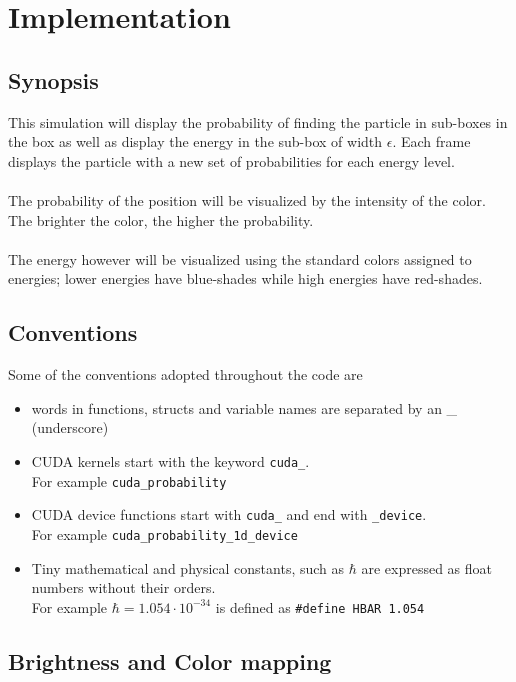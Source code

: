 \documentclass[a4paper, 10pt]{article}
\begin{document}
\newpage

\section{Implementation}
    \subsection{Synopsis}
    This simulation will display the probability of finding the particle in sub-boxes in the box
    as well as display the energy in the sub-box of width $\epsilon$. Each frame displays the
    particle with a new set of probabilities for each energy level.\\\\
    The probability of the position will be visualized by the intensity of the color. The brighter
    the color, the higher the probability.\\\\
    The energy however will be visualized using the standard colors assigned to energies; lower
    energies have blue-shades while high energies have red-shades.

    \subsection{Conventions}
    Some of the conventions adopted throughout the code are
    \begin{itemize}
        \item words in functions, structs and variable names are separated by an \_ (underscore)
        \item CUDA kernels start with the keyword \texttt{cuda\_}.\\
              For example \texttt{cuda\_probability}
        \item CUDA device functions start with \texttt{cuda\_} and end with \texttt{\_device}.\\
              For example \texttt{cuda\_probability\_1d\_device}
        \item Tiny mathematical and physical constants, such as $\hbar$ are expressed
              as float numbers without their orders.\\ For example $\hbar = 1.054\cdot10^{-34}$
              is defined as \texttt{\#define HBAR 1.054}
    \end{itemize}

    \subsection{Brightness and Color mapping}
\end{document}
